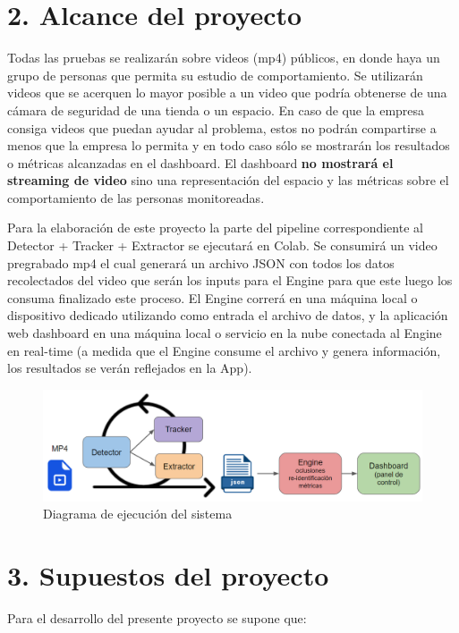 \documentclass[11pt]{charter}
\begin{document}
\section{2. Alcance del proyecto}
\label{sec:alcance}
Todas las pruebas se realizarán sobre videos (mp4) públicos, en donde haya un grupo de personas que permita su estudio de comportamiento. Se utilizarán videos que se acerquen lo mayor posible a un video que podría obtenerse de una cámara de seguridad de una tienda o un espacio. En caso de que la empresa consiga videos que puedan ayudar al problema, estos no podrán compartirse a menos que la empresa lo permita y en todo caso sólo se mostrarán los resultados o métricas alcanzadas en el dashboard. El dashboard \textbf{no mostrará el streaming de video} sino una representación del espacio y las métricas sobre el comportamiento de las personas monitoreadas.

Para la elaboración de este proyecto la parte del pipeline correspondiente al Detector + Tracker + Extractor se ejecutará en Colab. Se consumirá un video pregrabado mp4 el cual generará un archivo JSON con todos los datos recolectados del video que serán los inputs para el Engine para que este luego los consuma finalizado este proceso. El Engine correrá en una máquina local o dispositivo dedicado utilizando como entrada el archivo de datos, y la aplicación web dashboard  en una máquina local o servicio en la nube conectada al Engine en real-time (a medida que el Engine consume el archivo y genera información, los resultados se verán reflejados en la App).

\begin{figure}[htpb]
\centering 
\includegraphics[width=.7\textwidth]{./Figuras/diagEjecucion.png}
\caption{Diagrama de ejecución del sistema}
\label{fig:diagEjecucion}
\end{figure}

\newpage

\section{3. Supuestos del proyecto}
\label{sec:supuestos}

Para el desarrollo del presente proyecto se supone que:
\end{document}
